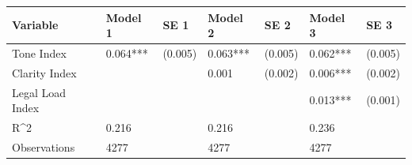 \begin{tabular}{lllllll}
\toprule
Variable & Model 1 & SE 1 & Model 2 & SE 2 & Model 3 & SE 3 \\
\midrule
Tone Index & 0.064*** & (0.005) & 0.063*** & (0.005) & 0.062*** & (0.005) \\
Clarity Index &  &  & 0.001 & (0.002) & 0.006*** & (0.002) \\
Legal Load Index &  &  &  &  & 0.013*** & (0.001) \\
R^2 & 0.216 &  & 0.216 &  & 0.236 &  \\
Observations & 4277 &  & 4277 &  & 4277 &  \\
\bottomrule
\end{tabular}
